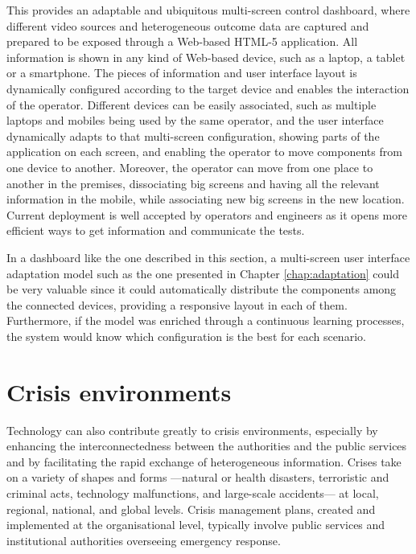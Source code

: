 This provides an adaptable and ubiquitous multi-screen control dashboard, where different video sources and heterogeneous outcome data are captured and prepared to be exposed through a
Web-based HTML-5 application. All information is shown in any kind of Web-based device, such as a laptop, a tablet or a smartphone. The pieces of information and user interface layout is dynamically configured according to the target device and enables the interaction of the operator. Different devices can be easily associated, such as multiple laptops and mobiles being used by the same operator, and the user interface dynamically adapts to that multi-screen configuration, showing parts of the application on each screen, and enabling the operator to move components from one device to another. Moreover, the operator can move from one place to another in the premises, dissociating big screens and having all the relevant information in the mobile, while associating new big screens in the new location.
Current deployment is well accepted by operators and engineers as it opens more efficient ways to get information and communicate the tests.

In a dashboard like the one described in this section, a multi-screen user interface adaptation model such as the one presented in Chapter \ref{chap:adaptation} could be very valuable since it could automatically distribute the components among the connected devices, providing a responsive layout in each of them. Furthermore, if the model was enriched through a continuous learning processes, the system would know which configuration is the best for each scenario.   



\section{Crisis environments}

Technology can also contribute greatly to crisis environments, especially by enhancing the interconnectedness between the authorities and the public services and by facilitating the rapid exchange of heterogeneous information. Crises take on a variety of shapes and forms —natural or health disasters, terroristic and criminal acts, technology malfunctions, and large-scale accidents— at local, regional, national, and global levels. Crisis management plans, created and implemented at the organisational level, typically involve public services and institutional authorities overseeing emergency response. 

